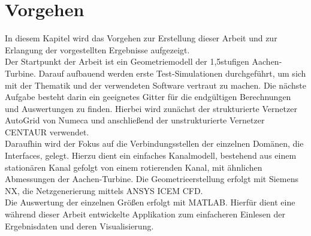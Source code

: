 \chapter{Vorgehen}
In diesem Kapitel wird das Vorgehen zur Erstellung dieser Arbeit und zur Erlangung der vorgestellten Ergebnisse aufgezeigt. \\
Der Startpunkt der Arbeit ist ein Geometriemodell der 1,5stufigen Aachen-Turbine. Darauf aufbauend werden erste Test-Simulationen durchgeführt, um sich mit der Thematik und der verwendeten Software vertraut zu machen. Die nächste Aufgabe besteht darin ein geeignetes Gitter für die endgültigen Berechnungen und Auswertungen zu finden. Hierbei wird zunächst der strukturierte Vernetzer AutoGrid von Numeca und anschließend der unstrukturierte Vernetzer CENTAUR verwendet.\\
Daraufhin wird der Fokus auf die Verbindungsstellen der einzelnen Domänen, die Interfaces, gelegt. Hierzu dient ein einfaches Kanalmodell, bestehend aus einem stationären Kanal gefolgt von einem rotierenden Kanal, mit ähnlichen Abmessungen der Aachen-Turbine. Die Geometrieerstellung erfolgt mit Siemens NX, die Netzgenerierung mittels ANSYS ICEM CFD.\\ 
Die Auswertung der einzelnen Größen erfolgt mit MATLAB. Hierfür dient eine während dieser Arbeit entwickelte Applikation zum einfacheren Einlesen der Ergebnisdaten und deren Visualisierung.    

